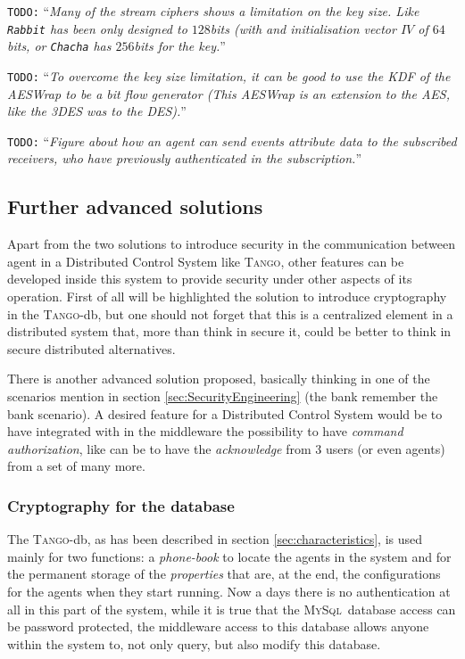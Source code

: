 \documentclass[10pt,a4paper,twoside]{llncs}
\newcommand{\todo}[1]{\texttt{\color{red}TODO:} ``\emph{#1}''}
\newcommand{\tango}{\textsc{Tango}}
\newcommand{\mysql}{\textsc{MySql}}
\begin{document}
\todo{Many of the stream ciphers shows a limitation on the key size. Like {\tt Rabbit} \cite{rfc4503} has been only designed to $128$bits (with and initialisation vector $IV$ of $64$bits, or {\tt Chacha} \cite{bernstein2008chacha} has $256$bits for the key.}

\todo{To overcome the key size limitation, it can be good to use the KDF of the AESWrap \cite{rfc3394} to be a bit flow generator (This AESWrap is an extension to the AES, like the 3DES was to the DES).}

\todo{Figure about how an agent can send events attribute data to the subscribed receivers, who have previously authenticated in the subscription.}

\subsection{Further advanced solutions}\label{sec:advancedSolutions}

Apart from the two solutions to introduce security in the communication between agent in a Distributed Control System like \tango, other features can be developed inside this system to provide security under other aspects of its operation. First of all will be highlighted the solution to introduce cryptography in the \tango-db, but one should not forget that this is a centralized element in a distributed system that, more than think in secure it, could be better to think in secure distributed alternatives.

There is another advanced solution proposed, basically thinking in one of the scenarios mention in section \ref{sec:SecurityEngineering} (the bank remember the bank scenario). A desired feature for a Distributed Control System would be to have integrated with in the middleware the possibility to have \emph{command authorization}, like can be to have the \emph{acknowledge} from 3 users (or even agents) from a set of many more.

\subsubsection{Cryptography for the database}\label{sec:Database}

The \tango-db, as has been described in section \ref{sec:characteristics}, is used mainly for two functions: a \emph{phone-book} to locate the agents in the system and for the permanent storage of the \emph{properties} that are, at the end, the configurations for the agents when they start running. Now a days there is no authentication at all in this part of the system, while it is true that the \mysql\, database access can be password protected, the middleware access to this database allows anyone within the system to, not only query, but also modify this database.
\end{document}

